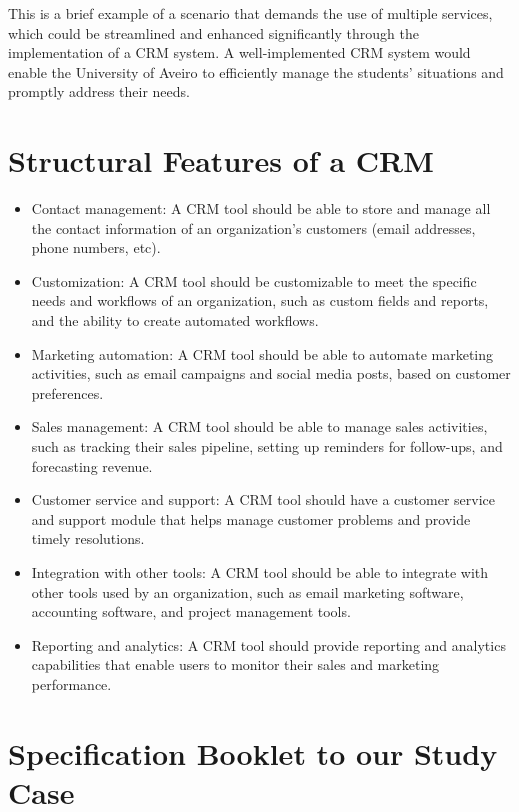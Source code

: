\documentclass{article}
\begin{document}
This is a brief example of a scenario that demands the use of multiple services, which could be streamlined and enhanced significantly through the implementation of a CRM system. A well-implemented CRM system would enable the University of Aveiro to efficiently manage the students' situations and promptly address their needs.

\section{Structural Features of a CRM}

\begin{itemize}
    \item Contact management: A CRM tool should be able to store and manage all the contact information of an organization's customers (email addresses, phone numbers, etc).

    \item Customization: A CRM tool should be customizable to meet the specific needs and workflows of an organization, such as custom fields and reports, and the ability to create automated workflows.

    \item Marketing automation: A CRM tool should be able to automate marketing activities, such as email campaigns and social media posts, based on customer preferences.

    \item Sales management: A CRM tool should be able to manage sales activities, such as tracking their sales pipeline, setting up reminders for follow-ups, and forecasting revenue.

    \item Customer service and support: A CRM tool should have a customer service and support module that helps manage customer problems and provide timely resolutions.

    \item Integration with other tools: A CRM tool should be able to integrate with other tools used by an organization, such as email marketing software, accounting software, and project management tools.

    \item Reporting and analytics: A CRM tool should provide reporting and analytics capabilities that enable users to monitor their sales and marketing performance.
\end{itemize}


\section{Specification Booklet to our Study Case}
\end{document}
